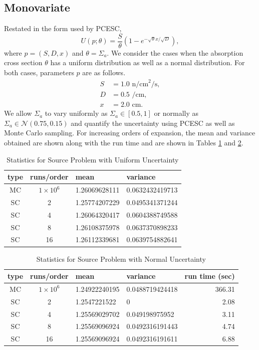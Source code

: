 \subsection{Monovariate}
Restated in the form used by PCESC,
\begin{equation}
U(p;\theta) = \frac{S}{\theta}\left(1-e^{-\sqrt{\theta} x/\sqrt{D}}\right),
\end{equation}
where $p=(S,D,x)$ and $\theta=\Sigma_a$.  
We consider the cases when the absorption cross section $\theta$ has a uniform distribution as well as a normal distribution.   For both cases, parameters $p$ are as follows.
\begin{align}
S &= 1.0 \text{ n/cm}^2\text{/s},\\
D &= 0.5 \text{ /cm},\\
x &= 2.0 \text{ cm}.
\end{align}
We allow $\Sigma_a$ to vary uniformly as $\Sigma_a\in[0.5,1]$ or normally as $\Sigma_a\in\mathcal{N}(0.75,0.15)$ and quantify the uncertainty using PCESC as well as Monte Carlo sampling.
For increasing orders of expansion, the mean and variance obtained are shown along with the run time and are shown in Tables \ref{tab:source uni} and \ref{tab:source norm}.
\begin{table}
\begin{center}
\begin{tabular}{c c|l l}
type & runs/order & mean & variance \\ \hline
MC & $1\times10^6$ & 1.26069628111 & 0.0632432419713\\
SC & 2 & 1.25774207229 & 0.0495341371244 \\
SC & 4 & 1.26064320417 & 0.0604388749588 \\
SC & 8 & 1.26108375978 & 0.0637370898233\\
SC & 16 & 1.26112339681 & 0.0639754882641
\end{tabular}
\end{center}
\caption{Statistics for Source Problem with Uniform Uncertainty}
\label{tab:source uni}
\end{table}

\begin{table}[h!]
\begin{center}
\begin{tabular}{c c|l l| r}
type & runs/order & mean & variance & run time (sec) \\ \hline
MC & $1\times10^6$ & 1.24922240195 & 0.0488719424418 & 366.31\\
SC & 2 & 1.2547221522 & 0 & 2.08 \\
SC & 4 & 1.25569029702 & 0.049198975952 & 3.11 \\
SC & 8 & 1.25569096924 & 0.0492316191443 & 4.74\\
SC & 16 & 1.25569096924 & 0.0492316191611 & 6.88
\end{tabular}
\end{center}
\caption{Statistics for Source Problem with Normal Uncertainty}
\label{tab:source norm}
\end{table}

